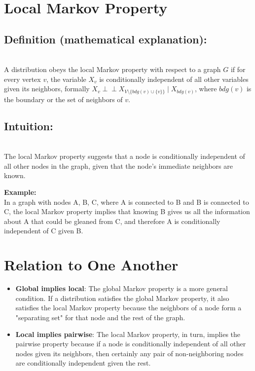 \documentclass{article}
\begin{document}
\section*{Local Markov Property}
\subsection{Definition (mathematical explanation):}\\
A distribution obeys the local Markov property with respect to a graph \( G \) if for every vertex \( v \), the variable \( X_v \) is conditionally independent of all other variables given its neighbors, formally \( X_v \perp \!\!\! \perp X_{V\setminus\{bdg(v) \cup \{v\}\}} \mid X_{bdg(v)} \), where \( bdg(v) \) is the boundary or the set of neighbors of \( v \).

\subsection{Intuition:}\\
The local Markov property suggests that a node is conditionally independent of all other nodes in the graph, given that the node's immediate neighbors are known.

\textbf{Example:}\\
In a graph with nodes A, B, C, where A is connected to B and B is connected to C, the local Markov property implies that knowing B gives us all the information about A that could be gleaned from C, and therefore A is conditionally independent of C given B.

\section{Relation to One Another}
\begin{itemize}
  \item \textbf{Global implies local}: The global Markov property is a more general condition. If a distribution satisfies the global Markov property, it also satisfies the local Markov property because the neighbors of a node form a "separating set" for that node and the rest of the graph.

  \item \textbf{Local implies pairwise}: The local Markov property, in turn, implies the pairwise property because if a node is conditionally independent of all other nodes given its neighbors, then certainly any pair of non-neighboring nodes are conditionally independent given the rest.

\end{itemize}
\end{document}
